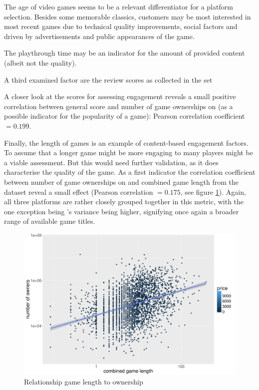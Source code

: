 The age of video games seems to be a relevant differentiator for a platform selection. Besides some memorable classics, customers may be most interested in most recent games due to technical quality improvements, social factors  and driven by advertisements and public appearances of the game. 

The playthrough time may be an indicator for the amount of provided content (albeit not the quality).
 

A third examined factor are the review scores as collected in the \metacritic set 

A closer look at the \metacritic scores for assessing engagement reveals a small positive correlation between general score and number of game ownerships on \steam (as a possible indicator for the popularity of a game): Pearson correlation coefficient $= 0.199$.



Finally, the length of games is an example of content-based engagement factors. To assume that a longer game might be more engaging to many players might be a viable assessment. But this would need further validation, as it does characterise the quality of the game. As a first indicator the correlation coefficient between number of game ownerships on \steam and combined game length from the \hltb dataset reveal a small effect (Pearson correlation $= 0.175$, see figure \ref{fig:rel-combinedlength-owners}). Again, all three platforms are rather closely grouped together in this metric, with the one exception being \steam's variance being higher, signifying once again a broader range of available game titles.



\begin{figure}[!t]
	\centering
	\includegraphics[width=1.0\columnwidth]{images/rel-combinedlength-owners.pdf}
	\caption{Relationship game length to ownership}
\label{fig:rel-combinedlength-owners}
\end{figure}


